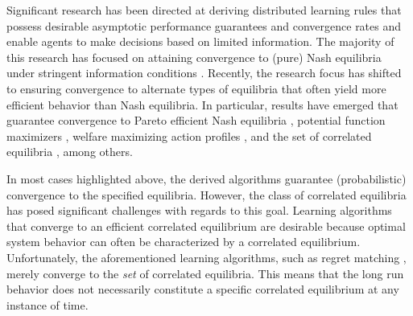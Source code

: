 Significant research has been directed at deriving distributed learning rules that possess desirable asymptotic performance guarantees and convergence rates and enable agents to make decisions based on limited information. The majority of this research has focused on attaining convergence to (pure) Nash equilibria under stringent information conditions \cite{Young2009, Frihauf2012, Foster2006, Boussaton2012, Poveda2013, Gharesifard2012}. Recently, the research focus has shifted to ensuring convergence to alternate types of equilibria that often yield more efficient behavior than Nash equilibria.  In particular, results have emerged that guarantee convergence to Pareto efficient Nash equilibria \cite{Marden2009,Pradelski2012}, potential function maximizers \cite{Blume1993, Marden2012}, welfare maximizing action profiles \cite{Marden2011, Arieli2012}, and the set of correlated equilibria \cite{Hart2000,Marden2013c,Aumann1987,Foster1997}, among others.  

In most cases highlighted above, the derived algorithms guarantee (probabilistic) convergence to the specified equilibria.  However, the class of correlated equilibria has posed significant challenges with regards to this goal. Learning algorithms that converge to an efficient correlated equilibrium are desirable because optimal system behavior can often be characterized by a correlated equilibrium. Unfortunately, the aforementioned learning algorithms, such as regret matching \cite{Hart2000}, merely converge to the \emph{set} of correlated equilibria. This means that the long run behavior does not necessarily constitute a specific correlated equilibrium at any instance of time.







